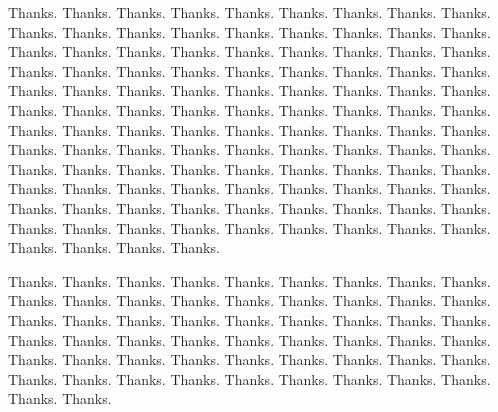 
Thanks. Thanks. Thanks.  Thanks.  Thanks.  Thanks.  Thanks.  Thanks. Thanks. Thanks. Thanks.  Thanks.  Thanks.  Thanks.  Thanks.  Thanks. Thanks. Thanks. Thanks.  Thanks.  Thanks.  Thanks.  Thanks.  Thanks. Thanks. Thanks. Thanks.  Thanks.  Thanks.  Thanks.  Thanks.  Thanks. Thanks. Thanks. Thanks.  Thanks.  Thanks.  Thanks.  Thanks.  Thanks. Thanks. Thanks. Thanks.  Thanks.  Thanks.  Thanks.  Thanks.  Thanks. Thanks. Thanks. Thanks.  Thanks.  Thanks.  Thanks.  Thanks.  Thanks. Thanks. Thanks. Thanks.  Thanks.  Thanks.  Thanks.  Thanks.  Thanks. Thanks. Thanks. Thanks.  Thanks.  Thanks.  Thanks.  Thanks.  Thanks. Thanks. Thanks. Thanks.  Thanks.  Thanks.  Thanks.  Thanks.  Thanks. Thanks. Thanks. Thanks.  Thanks.  Thanks.  Thanks.  Thanks.  Thanks. Thanks. Thanks. Thanks.  Thanks.  Thanks.  Thanks.  Thanks.  Thanks. Thanks. Thanks. Thanks.  Thanks.  Thanks.  Thanks.  Thanks.  Thanks. Thanks. Thanks. Thanks.  Thanks.  Thanks.  Thanks.  Thanks.  Thanks. 


Thanks. Thanks. Thanks.  Thanks.  Thanks.  Thanks.  Thanks.  Thanks. Thanks. Thanks. Thanks.  Thanks.  Thanks.  Thanks.  Thanks.  Thanks. Thanks. Thanks. Thanks.  Thanks.  Thanks.  Thanks.  Thanks.  Thanks. Thanks. Thanks. Thanks.  Thanks.  Thanks.  Thanks.  Thanks.  Thanks. Thanks. Thanks. Thanks.  Thanks.  Thanks.  Thanks.  Thanks.  Thanks. Thanks. Thanks. Thanks.  Thanks.  Thanks.  Thanks.  Thanks.  Thanks. Thanks. Thanks. Thanks.  Thanks.  Thanks.  Thanks.  Thanks.  Thanks. 

\clearpage